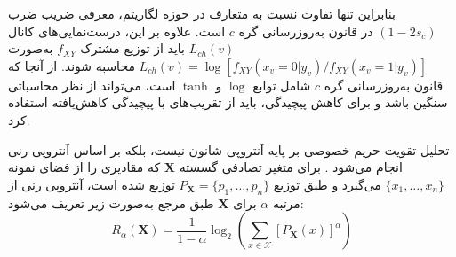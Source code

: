 بنابراین تنها تفاوت نسبت به  متعارف در حوزه لگاریتم، معرفی ضریب ضرب $(1 - 2s_c)$ در قانون به‌روزرسانی گره $c$ است. علاوه بر این، درست‌نمایی‌های کانال $L_{ch}(v)$ باید از توزیع مشترک $f_{XY}$ به‌صورت $L_{ch}(v) = \log [f_{XY}(x_v = 0|y_v) / f_{XY}(x_v = 1|y_v)]$ محاسبه شوند. از آنجا که قانون به‌روزرسانی گره $c$ شامل توابع $\log$ و $\tanh$ است، می‌تواند از نظر محاسباتی سنگین باشد و برای کاهش پیچیدگی، باید از تقریب‌های با پیچیدگی کاهش‌یافته استفاده کرد.


تحلیل تقویت حریم خصوصی بر پایه آنتروپی شانون نیست، بلکه بر اساس آنتروپی رنی انجام می‌شود \cite{114, 115, 116}. برای متغیر تصادفی گسسته $\bm{X}$ که مقادیری را از فضای نمونه $\{x_1, \dots, x_n\}$ می‌گیرد و طبق توزیع $P_{\bm{X}} = \{p_1, \dots, p_n\}$ توزیع شده است، آنتروپی رنی از مرتبه $\alpha$ برای $\bm{X}$ طبق مرجع \cite{115} به‌صورت زیر تعریف می‌شود:
\begin{equation}
	R_\alpha(\bm{X}) = \frac{1}{1-\alpha} \log_2 \left( \sum_{x \in \mathcal{X}} [P_{\bm{X}}(x)]^\alpha \right)
	\label{eq:6-60}
\end{equation}

